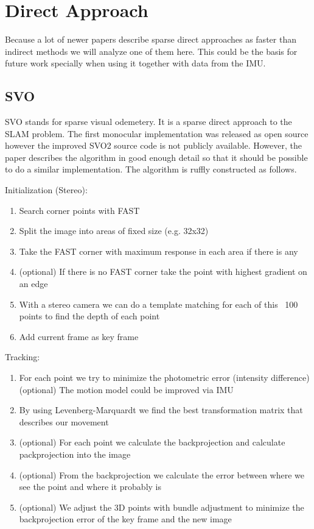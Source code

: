 \documentclass[11pt,a4paper,titlepage,oneside]{report}
\begin{document}
\chapter{Direct Approach}

Because a lot of newer papers describe sparse direct approaches as faster than indirect methods we will analyze one of them here. This could be the basis for future work specially when using it together with data from the IMU.

\section{SVO}

SVO stands for sparse visual odemetery. It is a sparse direct approach to the SLAM problem. The first monocular implementation was released as open source however the improved SVO2 source code is not publicly available. However, the paper describes the algorithm in good enough detail so that it should be possible to do a similar implementation. The algorithm is ruffly constructed as follows.

Initialization (Stereo):
\begin{enumerate}
	\item Search corner points with FAST
	\item Split the image into areas of fixed size (e.g. 32x32)
	\item Take the FAST corner with maximum response in each area if there is any
	\item (optional) If there is no FAST corner take the point with highest gradient on an edge
	\item With a stereo camera we can do a template matching for each of this ~100 points to find the depth of each point
	\item Add current frame as key frame
\end{enumerate}

Tracking:
\begin{enumerate}
	\item For each point we try to minimize the photometric error (intensity difference)
		\subitem (optional) The motion model could be improved via IMU
	\item By using Levenberg-Marquardt we find the best transformation matrix that describes our movement
	\item (optional) For each point we calculate the backprojection and calculate packprojection into the image
	\item (optional) From the backprojection we calculate the error between where we see the point and where it probably is
	\item (optional) We adjust the 3D points with bundle adjustment to minimize the backprojection error of the key frame and the new image
\end{enumerate}
\end{document}
